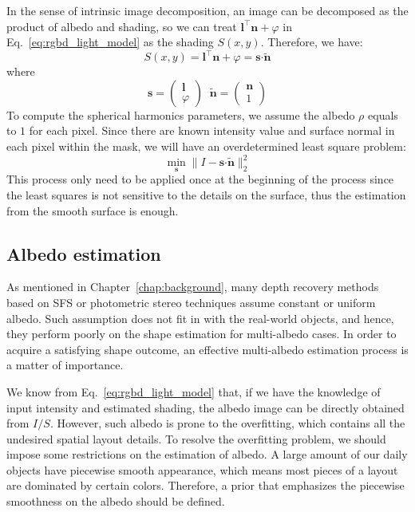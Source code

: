 In the sense of intrinsic image decomposition, an image can be decomposed as the product of albedo and shading, so we can treat $\mathbf{l}^\top \mathbf{n} + \varphi$ in Eq.~\ref{eq:rgbd_light_model} as the shading $S(x,y)$.
Therefore, we have:
\begin{equation}
S(x,y) = \mathbf{l}^\top \mathbf{n} + \varphi = \mathbf{s} \boldsymbol{\cdot} \tilde{\mathbf{n}}
\end{equation}
where
\begin{equation}
\mathbf{s} = \begin{pmatrix}\mathbf{l} \\ \varphi \end{pmatrix}   \; \; \tilde{\mathbf{n}} = \begin{pmatrix}\mathbf{n} \\ 1\end{pmatrix}  
\end{equation}
To compute the spherical harmonics parameters, we assume the albedo $\rho$ equals to $1$ for each pixel. 
Since there are known intensity value and surface normal in each pixel within the mask, we will have an overdetermined least square problem: 
\begin{equation}
\min_{\mathbf{s}} \lVert I - \mathbf{s} \boldsymbol{\cdot} \tilde{\mathbf{n}} \rVert^2_2
\end{equation}
This process only need to be applied once at the beginning of the process since the least squares is not sensitive to the details on the surface, thus the estimation from the smooth surface is enough.

\subsection{Albedo estimation}
As mentioned in Chapter~\ref{chap:background}, many depth recovery methods based on SFS or photometric stereo techniques assume constant or uniform albedo.
Such assumption does not fit in with the real-world objects, and hence, they perform poorly on the shape estimation for multi-albedo cases.
In order to acquire a satisfying shape outcome, an effective multi-albedo estimation process is a matter of importance.

We know from Eq.~\ref{eq:rgbd_light_model} that, if we have the knowledge of input intensity and estimated shading, the albedo image can be directly obtained from $I/S$.
However, such albedo is prone to the overfitting, which contains all the undesired spatial layout details.
To resolve the overfitting problem, we should impose some restrictions on the estimation of albedo.
A large amount of our daily objects have piecewise smooth appearance, which means most pieces of a layout are dominated by certain colors.
Therefore, a prior that emphasizes the piecewise smoothness on the albedo should be defined.

